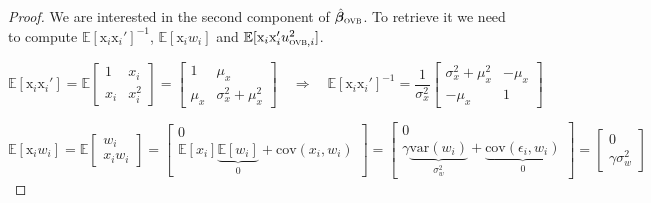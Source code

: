 \documentclass[usletter, 12pt]{article}
\begin{document}
\begin{proof}
				
				We are interested in the second component of $\hat{\bm{\beta}}_{\textsc{ovb}}$. To retrieve it we need to compute $\mathbb{E}[\text{x}_{i}\text{x}_{i}']^{-1}$, $ \mathbb{E}[\text{x}_{i} w_{i}] $ and $\mathbb{E}[\text{x}_{i}\text{x}_{i}'u_{\textsc{ovb}, i}^{2}]$.  
				
				\[ 
				\mathbb{E}[\text{x}_{i}\text{x}_i'] 
				= \mathbb{E} \begin{bmatrix}
					1 & x_{i}\\ 
					x_{i} & x_{i}^{2}
				\end{bmatrix} 
				=
				\begin{bmatrix}
					1 & \mu_{x}\\ 
					\mu_{x} & \sigma_{x}^{2} + \mu_{x}^2
				\end{bmatrix} 
				\quad \Rightarrow \quad
				     \mathbb{E}[\text{x}_{i}\text{x}_i']^{-1} = \dfrac{1}{\sigma_{x}^{2}} 
				     									\begin{bmatrix}
														 \sigma_{x}^{2} + \mu_{x}^2 & -\mu_{x}\\ 
														-\mu_{x} & 1
													\end{bmatrix} 
				\]
				
				\begin{equation*} 
            				\mathbb{E}[\text{x}_{i}w_i] = 
            				\mathbb{E}
            					\begin{bmatrix}
            						w_i\\ 
            						x_iw_i
            					\end{bmatrix} 
            				=
            				\begin{bmatrix}
            				    	0\\ 
            					\mathbb{E}[x_{i}]\underbrace{\mathbb{E}[w_{i}]}_{0} + \text{cov}(x_{i}, w_{i}) 
            				\end{bmatrix} 
            				= 
            				\begin{bmatrix}
            				    	0\\ 
            					\gamma  \underbrace{\text{var}(w_{i})}_{\sigma_{w}^{2}} + \underbrace{\text{cov}(\epsilon_{i}, w_{i})}_{0} 
            				\end{bmatrix} 
            				=
            				\begin{bmatrix}
            				    	0\\ 
            					\gamma \sigma_{w}^{2}
            				\end{bmatrix} 
				\end{equation*}
				

\end{proof}
\end{document}
